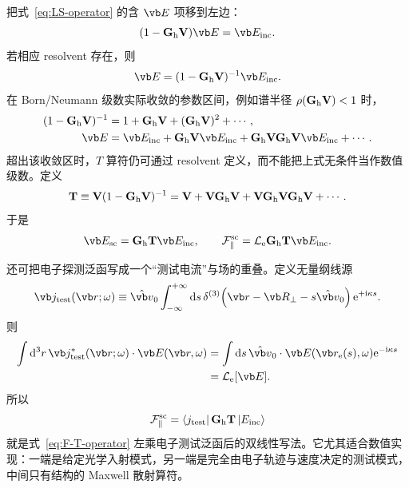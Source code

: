 把式~\cref{eq:LS-operator} 的含 $\vb E$ 项移到左边：
\begin{equation}
(1-\mathbf G_{\rm h}\mathbf V)\vb E=\vb E_{\rm inc}.
\end{equation}
若相应 resolvent 存在，则
\begin{equation}
\vb E=(1-\mathbf G_{\rm h}\mathbf V)^{-1}\vb E_{\rm inc}.
\end{equation}
在 Born/Neumann 级数实际收敛的参数区间，例如谱半径 $\rho(\mathbf G_{\rm h}\mathbf V)<1$ 时，
\begin{align}
(1-\mathbf G_{\rm h}\mathbf V)^{-1}
&=1+\mathbf G_{\rm h}\mathbf V
+(\mathbf G_{\rm h}\mathbf V)^2+\cdots,\\
\vb E
&=\vb E_{\rm inc}
+\mathbf G_{\rm h}\mathbf V\vb E_{\rm inc}
+\mathbf G_{\rm h}\mathbf V\mathbf G_{\rm h}\mathbf V\vb E_{\rm inc}+\cdots.
\end{align}
超出该收敛区时，$T$ 算符仍可通过 resolvent 定义，而不能把上式无条件当作数值级数。定义
\begin{equation}
{
\mathbf T
\equiv\mathbf V(1-\mathbf G_{\rm h}\mathbf V)^{-1}
=\mathbf V+\mathbf V\mathbf G_{\rm h}\mathbf V
+\mathbf V\mathbf G_{\rm h}\mathbf V\mathbf G_{\rm h}\mathbf V+\cdots.}
\label{eq:T-operator}
\end{equation}
于是
\begin{equation}
{
\vb E_{\rm sc}=\mathbf G_{\rm h}\mathbf T\vb E_{\rm inc},
\qquad
\mathcal F_{\parallel}^{\rm sc}=\mathcal L_{\rm e}\mathbf G_{\rm h}\mathbf T\vb E_{\rm inc}.}
\label{eq:F-T-operator}
\end{equation}

还可把电子探测泛函写成一个“测试电流”与场的重叠。定义无量纲线源
\begin{equation}
 \vb j_{\rm test}(\vb r;\omega)
 \equiv
 \hat{\vb v}_0
 \int_{-\infty}^{+\infty}\dd s\,
 \delta^{(3)}\!\left(\vb r-\vb R_\perp-s\hat{\vb v}_0\right)
 \ee^{+\ii\kappa s}.
 \label{eq:test-current}
\end{equation}
则
\begin{align}
\int\dd^3r\,
\vb j_{\rm test}^*(\vb r;\omega)\cdot\vb E(\vb r,\omega)
&=\int\dd s\,
\hat{\vb v}_0\cdot\vb E(\vb r_{\rm e}(s),\omega)
\ee^{-\ii\kappa s}\\
&=\mathcal L_{\rm e}[\vb E].
\end{align}
所以
\begin{equation}
 {
 \mathcal F_{\parallel}^{\rm sc}
 =\langle j_{\rm test}|\,\mathbf G_{\rm h}\mathbf T\,|E_{\rm inc}\rangle}
 \label{eq:pinem-bilinear-scattering-form}
\end{equation}
就是式~\cref{eq:F-T-operator} 左乘电子测试泛函后的双线性写法。它尤其适合数值实现：一端是给定光学入射模式，另一端是完全由电子轨迹与速度决定的测试模式，中间只有结构的 Maxwell 散射算符。

